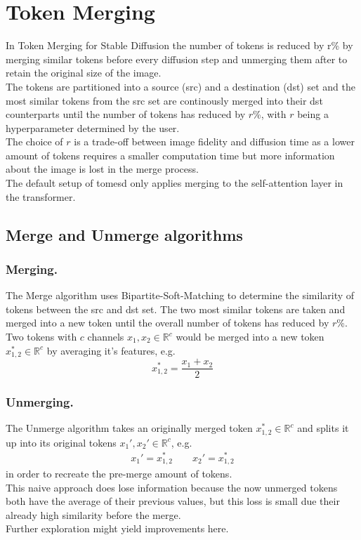 \section{Token Merging}
In Token Merging for Stable Diffusion\cite{bolya2023tomesd} the number of tokens is reduced by r\% by merging similar tokens before every diffusion step and unmerging them after to retain the original size of the image.\\ The tokens are partitioned into a source (src) and a destination (dst) set and the most similar tokens from the src set are continously merged into their dst counterparts until the number of tokens has reduced by \(r\)\%, with \(r\) being a hyperparameter determined by the user.\\ The choice of \(r\) is a trade-off between image fidelity and diffusion time as a lower amount of tokens requires a smaller computation time but more information about the image is lost in the merge process.\\
The default setup of tomesd\cite{bolya2023tomesd} only applies merging to the self-attention layer in the transformer.

\subsection{Merge and Unmerge algorithms}
\subsubsection*{Merging.} The Merge algorithm uses Bipartite-Soft-Matching to determine the similarity of tokens between the src and dst set. The two most similar tokens are taken and merged into a new token until the overall number of tokens has reduced by \(r\)\%.\\
Two tokens with \(c\) channels \(x_1, x_2 \in \mathbb{R}^c\) would be merged into a new token \(x_{1,2}^* \in \mathbb{R}^c \) by averaging it's features, e.g. \[x_{1,2}^* = \frac{x_1 + x_2}{2}\]

\subsubsection*{Unmerging.} The Unmerge algorithm takes an originally merged token $x_{1,2}^* \in \mathbb{R}^c$ and splits it up into its original tokens $x_1', x_2' \in \mathbb{R}^c$, e.g. 
\begin{align*}
    x_1' = x_{1,2}^* \quad\quad
    x_2' = x_{1,2}^*
\end{align*}
in order to recreate the pre-merge amount of tokens.\\
This naive approach does lose information because the now unmerged tokens both have the average of their previous values, but this loss is small due their already high similarity before the merge.\\ Further exploration might yield improvements here.

